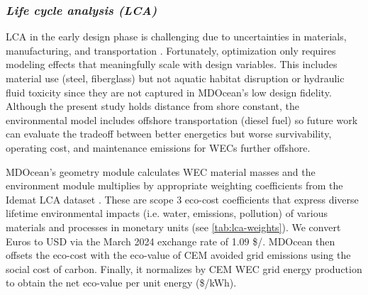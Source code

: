 \subsubsection{\textit{Life cycle analysis (LCA)}}
LCA in the early design phase is challenging due to uncertainties in materials, manufacturing, and transportation \cite{moni_life_2020}.
Fortunately, optimization only requires modeling effects that meaningfully scale with design variables.
This includes material use (steel, fiberglass) but not aquatic habitat disruption or hydraulic fluid toxicity since they are not captured in MDOcean's low design fidelity.
Although the present study holds distance from shore constant, the environmental model includes offshore transportation (diesel fuel) so future work can evaluate the tradeoff between better energetics but worse survivability, operating cost, and maintenance emissions for WECs further offshore.

MDOcean's geometry module calculates WEC material masses and the environment module multiplies by appropriate weighting coefficients from the Idemat LCA dataset \cite{van_den_herik_idemat_2024}.
These are scope 3 eco-cost coefficients \cite{vogtlander_lca-based_2010} that express diverse lifetime environmental impacts (i.e. water, emissions, pollution) of various materials and processes in monetary units (see \cref{tab:lca-weights}).
We convert Euros to USD via the March 2024 exchange rate of 1.09 \$/\texteuro.
MDOcean then offsets the eco-cost with the eco-value of CEM avoided grid emissions using the social cost of carbon.
Finally, it normalizes by CEM WEC grid energy production to obtain the net eco-value per unit energy (\$/kWh).

\newcommand{\ecoCostTable}{
    \begin{table}[H]
    \centering
    \begin{tabular}{ ll } 
        \hline
        Component & Value \\ 
        \hline
        Steel & 0.192 \$/kg \\ 
        Fiberglass & 6.950 \$/m\textsuperscript{2} \\ 
        Dist. from shore & 65.88 \$/mile \\ 
        Social cost of CO\textsubscript{2} & 0.145 \$/kgCO\textsubscript{2} \\
    \end{tabular}
    \caption{Eco-cost coefficients}
    \label{tab:lca-weights}
    \end{table}
}

